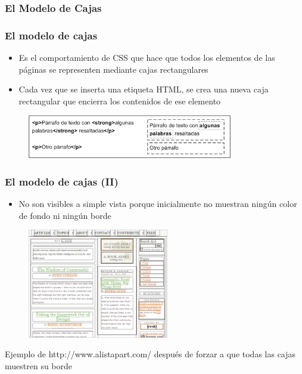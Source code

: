 
\subsubsection*{El Modelo de Cajas}

\begin{frame}
\frametitle{El modelo de cajas}

\begin{itemize}
  \item Es el comportamiento de CSS que hace que todos los elementos de las páginas se representen mediante cajas rectangulares
  \item  Cada vez que se inserta una etiqueta HTML, se crea una nueva caja rectangular que encierra los contenidos de ese elemento
\end{itemize}


\begin{center}
\begin{figure}[p]
\includegraphics[width=0.8\textwidth]{figs/f0402.png}
\end{figure}
\end{center}

\end{frame}


\begin{frame}
\frametitle{El modelo de cajas (II)}

\begin{itemize}
  \item No son visibles a simple vista porque inicialmente no muestran ningún color de fondo ni ningún borde
\end{itemize}

\begin{center}
\begin{figure}[p]
\includegraphics[width=0.55\textwidth]{figs/f0401.png}
\end{figure}
\end{center}
{\footnotesize
Ejemplo de http://www.alistapart.com/ después de forzar a que todas las cajas muestren su borde
}

\end{frame}

